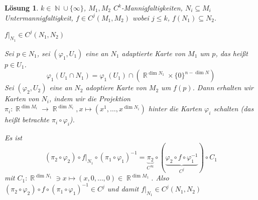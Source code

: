 \documentclass[paper=A4, twoside, chapterprefix=true, bibliography=totoc, headsepline]{scrbook}
\let\temp\phi
\let\phi\varphi
\let\varphi\temp
\let\temp\theta
\let\theta\vartheta
\let\vartheta\temp
\let\temp\epsilon
\let\epsilon\varepsilon
\let\varepsilon\temp
\let\temp\rho
\let\rho\varrho
\let\varrho\temp
\DeclareMathOperator{\N}{\mathbb{N}}
\DeclareMathOperator{\R}{\mathbb{R}}
\theoremstyle{plain}
\theoremstyle{nonumberplain}
\theoremstyle{empty}
\theoremstyle{break}
\newtheorem{Loes}{L\"osung}
\begin{document}
\begin{Loes}
$k \in \N \cup \{\infty\}$, $M_1, M_2$ $C^k$-Mannigfaltigkeiten, $N_i \subseteq M_i$ Untermannigfaltigkeit, $f \in C^j(M_1, M_2)$ wobei $j \le k$, $f(N_1) \subseteq N_2$.
\begin{description}[font=\normalfont\itshape,leftmargin=*]
\item[Behauptung:]
	$f|_{N_1} \in C^j(N_1, N_2)$
\item[Beweis:]
	Sei $p \in N_1$, sei $(\phi_1, U_1)$ eine an $N_1$ adaptierte Karte von $M_1$ um $p$, das hei\ss t $p \in U_1$.
		\[ \phi_1(U_1 \cap N_1) = \phi_1(U_1) \cap \left(\R^{\dim N_1} \times \{0\}^{n-\dim N}\right) \]
	Sei $(\phi_2, U_2)$ eine an $N_2$ adoptiere Karte von $M_2$ um $f(p)$. Dann erhalten wir Karten von $N_i$, indem wir die Projektion $\pi_i: \R^{\dim M_i} \to \R^{\dim N_i}, x \mapsto (x^1,\ldots ,x^{\dim N_i})$ hinter die Karten $\phi_i$ schalten (das hei\ss t betrachte $\pi_i \circ \phi_i$).
	
	Es ist
		\[(\pi_2 \circ \phi_2) \circ f|_{N_1} \circ (\pi_1 \circ \phi_1)^{-1} = \underbrace{\pi_2}_{C^\infty} \circ (\underbrace{\phi_2 \circ f \circ \phi_1^{-1}}_{C^j}) \circ C_1\]
	mit $C_1: \R^{\dim N_1} \ni x \mapsto (x, 0,\ldots ,0) \in \R^{\dim M_1}$. Also $(\pi_2 \circ \phi_2) \circ f \circ (\pi_1 \circ \phi_1)^{-1} \in C^j$ und damit $f|_{N_1} \in C^j(N_1, N_2)$
\end{description}
\end{Loes}
\end{document}
